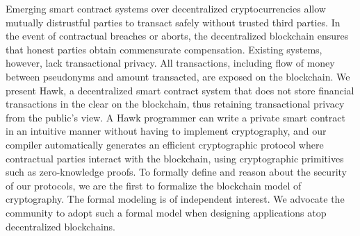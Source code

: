 Emerging smart contract systems over decentralized
cryptocurrencies allow mutually distrustful parties to transact
safely without trusted third parties. In the event of contractual breaches or aborts, the decentralized blockchain ensures
that honest parties obtain commensurate compensation. Existing
systems, however, lack transactional privacy. All transactions,
including flow of money between pseudonyms and amount
transacted, are exposed on the blockchain.
We present Hawk, a decentralized smart contract system that
does not store financial transactions in the clear on the blockchain, thus retaining transactional privacy from the public’s view.
A Hawk programmer can write a private smart contract in an
intuitive manner without having to implement cryptography, and
our compiler automatically generates an efficient cryptographic
protocol where contractual parties interact with the blockchain,
using cryptographic primitives such as zero-knowledge proofs.
To formally define and reason about the security of our
protocols, we are the first to formalize the blockchain model
of cryptography. The formal modeling is of independent interest.
We advocate the community to adopt such a formal model when
designing applications atop decentralized blockchains.